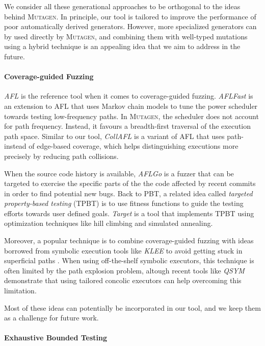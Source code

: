 \documentclass[acmsmall, anonymous]{acmart}
\newcommand{\mutagen}{\textsc{Mutagen}\xspace}
\begin{document}
We consider all these generational approaches to be orthogonal to the ideas
behind \mutagen.
%
In principle, our tool is tailored to improve the performance of poor
automatically derived generators.
%
However, more specialized generators can by used directly by \mutagen, and
combining them with well-typed mutations using a hybrid technique is an
appealing idea that we aim to address in the future.


\paragraph{Coverage-guided Fuzzing}

\emph{AFL} \cite{afl} is the reference tool when it comes to coverage-guided
fuzzing.
%
\emph{AFLFast} is an extension to AFL that uses Markov chain models to tune the
power scheduler towards testing low-frequency paths.
%
In \mutagen, the scheduler does not account for path frequency.
%
Instead, it favours a breadth-first traversal of the execution path space.
%
Similar to our tool, \emph{CollAFL} \cite{collAFL} is a variant of AFL that uses
path- instead of edge-based coverage, which helps distinguishing executions more
precisely by reducing path collisions.


When the source code history is available, \emph{AFLGo} \cite{aflgo} is a fuzzer
that can be targeted to exercise the specific parts of the the code affected by
recent commits in order to find potential new bugs.
%
Back to PBT, a related idea called \emph{targeted property-based testing} (TPBT)
is to use fitness functions to guide the testing efforts towards user defined
goals.
%
\emph{Target} \cite{targetedpbt} is a tool that implements TPBT using
optimization techniques like hill climbing and simulated annealing.


%
Moreover, a popular technique is to combine coverage-guided fuzzing with ideas
borrowed from symbolic execution tools like \emph{KLEE} \cite{klee} to avoid
getting stuck in superficial paths \cite{driller, qsym}.
%
When using off-the-shelf symbolic executors, this technique is often limited by
the path explosion problem, altough recent tools like \emph{QSYM} \cite{qsym}
demonstrate that using tailored concolic executors can help overcoming this
limitation.


Most of these ideas can potentially be incorporated in our tool, and we keep
them as a challenge for future work.


\paragraph{Exhaustive Bounded Testing}
\end{document}
